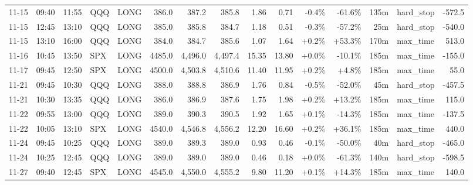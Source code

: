 \documentclass[11pt,a4paper,twoside]{article}
\begin{document}
\begin{landscape}
\begin{center}
\begin{longtable}{>{\color{txtmain}}l l l l l r r r r r r r r >{\color{txtmain}}l r}
11-15 & 09:40 & 11:55 & QQQ & LONG & 386.0 & 387.2 & 385.8 & 1.86 & 0.71 & \textcolor{lossred}{-0.4\%} & \textcolor{lossred}{-61.6\%} & 135m & hard\_stop & \textcolor{lossred}{-572.5} \\
11-15 & 12:45 & 13:10 & QQQ & LONG & 385.0 & 385.8 & 384.7 & 1.18 & 0.51 & \textcolor{lossred}{-0.3\%} & \textcolor{lossred}{-57.2\%} & 25m & hard\_stop & \textcolor{lossred}{-540.0} \\
11-15 & 13:10 & 16:00 & QQQ & LONG & 384.0 & 384.7 & 385.6 & 1.07 & 1.64 & \textcolor{wingreen}{+0.2\%} & \textcolor{wingreen}{+53.3\%} & 170m & max\_time & \textcolor{wingreen}{513.0} \\
11-16 & 10:45 & 13:50 & SPX & LONG & 4485.0 & 4,496.0 & 4,497.4 & 15.35 & 13.80 & \textcolor{wingreen}{+0.0\%} & \textcolor{lossred}{-10.1\%} & 185m & max\_time & \textcolor{lossred}{-155.0} \\
11-17 & 09:45 & 12:50 & SPX & LONG & 4500.0 & 4,503.8 & 4,510.6 & 11.40 & 11.95 & \textcolor{wingreen}{+0.2\%} & \textcolor{wingreen}{+4.8\%} & 185m & max\_time & \textcolor{wingreen}{55.0} \\
11-21 & 09:45 & 10:30 & QQQ & LONG & 388.0 & 388.8 & 386.9 & 1.76 & 0.84 & \textcolor{lossred}{-0.5\%} & \textcolor{lossred}{-52.0\%} & 45m & hard\_stop & \textcolor{lossred}{-457.5} \\
11-21 & 10:30 & 13:35 & QQQ & LONG & 386.0 & 386.9 & 387.6 & 1.75 & 1.98 & \textcolor{wingreen}{+0.2\%} & \textcolor{wingreen}{+13.2\%} & 185m & max\_time & \textcolor{wingreen}{115.0} \\
11-22 & 09:55 & 13:00 & QQQ & LONG & 389.0 & 390.3 & 390.5 & 1.92 & 1.65 & \textcolor{wingreen}{+0.1\%} & \textcolor{lossred}{-14.3\%} & 185m & max\_time & \textcolor{lossred}{-137.5} \\
11-22 & 10:05 & 13:10 & SPX & LONG & 4540.0 & 4,546.8 & 4,556.2 & 12.20 & 16.60 & \textcolor{wingreen}{+0.2\%} & \textcolor{wingreen}{+36.1\%} & 185m & max\_time & \textcolor{wingreen}{440.0} \\
11-24 & 09:45 & 10:25 & QQQ & LONG & 389.0 & 389.3 & 389.0 & 0.93 & 0.46 & \textcolor{lossred}{-0.1\%} & \textcolor{lossred}{-50.0\%} & 40m & hard\_stop & \textcolor{lossred}{-465.0} \\
11-24 & 10:25 & 12:45 & QQQ & LONG & 389.0 & 389.0 & 389.0 & 0.46 & 0.18 & \textcolor{wingreen}{+0.0\%} & \textcolor{lossred}{-61.3\%} & 140m & hard\_stop & \textcolor{lossred}{-598.5} \\
11-27 & 09:40 & 12:45 & SPX & LONG & 4545.0 & 4,550.0 & 4,555.2 & 9.80 & 11.20 & \textcolor{wingreen}{+0.1\%} & \textcolor{wingreen}{+14.3\%} & 185m & max\_time & \textcolor{wingreen}{140.0} \\

\end{longtable}
\end{center}
\end{landscape}
\end{document}
